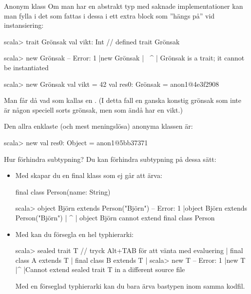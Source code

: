 \begin{Slide}{Anonym klass}\SlideFontSmall
Om man har en abstrakt typ med saknade implementationer kan man fylla i det som fattas i dessa i ett extra block som ''hängs på'' vid instansiering:
\begin{REPL}
scala> trait Grönsak { val vikt: Int }
// defined trait Grönsak

scala> new Grönsak
-- Error:
1 |new Grönsak
  |    ^^^^^^^
  |    Grönsak is a trait; it cannot be instantiated

scala> new Grönsak { val vikt = 42 }
val res0: Grönsak = anon1@4e3f2908
\end{REPL}
Man får då vad som kallas en . (I detta fall en ganska konstig grönsak som inte är någon speciell sorts grönsak, men som ändå har en vikt.)

\vspace{0.5em}

Den allra enklaste (och mest meningslösa) anonyma klassen är:
\begin{REPLsmall}
scala> new {}
val res0: Object = anon1@5bb37371
\end{REPLsmall}
\end{Slide}


\begin{Slide}{Hur förhindra subtypning?}
Du kan förhindra subtypning på dessa sätt:  
\begin{itemize}
\item Med  skapar du en final klass som ej går att ärva:
\begin{Code}
final class Person(name: String)
\end{Code}   
\begin{REPLsmall}
scala> object Björn extends Person("Björn")
-- Error:
1 |object Björn extends Person("Björn")
  |       ^
  |       object Björn cannot extend final class Person

\end{REPLsmall}
\item Med  kan du försegla en hel typhierarki:
\begin{REPLsmall}
scala> sealed trait T  // tryck Alt+TAB för att vänta med evaluering
     | final class A extends T
     | final class B extends T
     |
scala> new T{}
-- Error:
1 |new T{}
|^
|Cannot extend sealed trait T in a different source file
\end{REPLsmall}
Med en förseglad typhierarki kan du bara ärva bastypen inom samma kodfil. 
\end{itemize}
\end{Slide}


